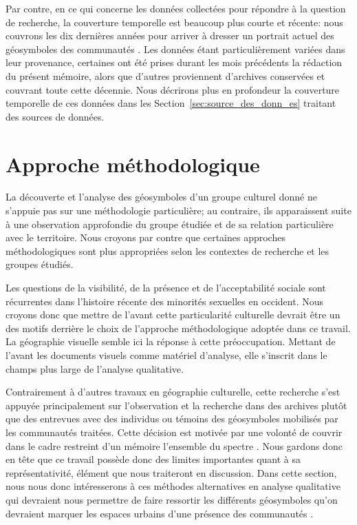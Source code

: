 Par contre, en ce qui concerne les données collectées pour répondre à la question de recherche, la couverture temporelle est beaucoup plus courte et récente: nous couvrons les dix dernières années pour arriver à dresser un portrait actuel des géosymboles des communautés \lgbt{}. 
Les données étant particulièrement variées dans leur provenance, certaines ont été prises durant les mois précédents la rédaction du présent mémoire, alors que d'autres proviennent d'archives conservées et couvrant toute cette décennie. 
Nous décrirons plus en profondeur la couverture temporelle de ces données dans les Section~\ref{sec:source_des_donn_es} traitant des sources de données.

\section{Approche méthodologique}
\label{sec:approche_m_thodologique}
La découverte et l'analyse des géosymboles d'un groupe culturel donné ne s'appuie pas sur une méthodologie particulière; au contraire, ils apparaissent suite à une observation approfondie du groupe étudiée et de sa relation particulière avec le territoire. 
Nous croyons par contre que certaines approches méthodologiques sont plus appropriées selon les contextes de recherche et les groupes étudiés.

Les questions de la visibilité, de la présence et de l'acceptabilité sociale sont récurrentes dans l'histoire récente des minorités sexuelles en occident. 
Nous croyons donc que mettre de l'avant cette particularité culturelle devrait être un des motifs derrière le choix de l'approche méthodologique adoptée dans ce travail. 
La géographie visuelle semble ici la réponse à cette préoccupation. 
Mettant de l'avant les documents visuels comme matériel d'analyse, elle s'inscrit dans le champs plus large de l'analyse qualitative.

Contrairement à d'autres travaux en géographie culturelle, cette recherche s'est appuyée principalement sur l'observation et la recherche dans des archives plutôt que des entrevues avec des individus \lgbt{} ou témoins des géosymboles mobilisés par les communautés traitées. 
Cette décision est motivée par une volonté de couvrir dans le cadre restreint d'un mémoire l'ensemble du spectre \lgbt{}.
Nous gardons donc en tête que ce travail possède donc des limites importantes quant à sa représentativité, élément que nous traiteront en discussion.
Dans cette section, nous nous donc intéresserons à ces méthodes alternatives en analyse qualitative qui devraient nous permettre de faire ressortir les différents géosymboles qu'on devraient marquer les espaces urbains d'une présence des communautés \lgbt{}.

